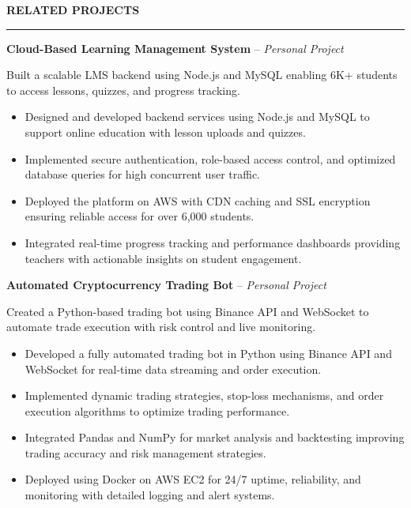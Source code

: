 \documentclass[10pt,letterpaper]{article}
\begin{document}
\vspace{6pt}

\textbf{RELATED PROJECTS}\\[-8pt]
\noindent\rule{\textwidth}{1pt}

\vspace{-2pt}

\textbf{Cloud-Based Learning Management System} -- \emph{Personal Project}

\vspace{-1pt}

Built a scalable LMS backend using Node.js and MySQL enabling 6K+ students to access lessons, quizzes, and progress tracking.
\vspace{-1pt}
\begin{itemize}
\item Designed and developed backend services using Node.js and MySQL to support online education with lesson uploads and quizzes.
\item Implemented secure authentication, role-based access control, and optimized database queries for high concurrent user traffic.
\item Deployed the platform on AWS with CDN caching and SSL encryption ensuring reliable access for over 6,000 students.
\item Integrated real-time progress tracking and performance dashboards providing teachers with actionable insights on student engagement.
\end{itemize}

\textbf{Automated Cryptocurrency Trading Bot} -- \emph{Personal Project}

\vspace{-1pt}

Created a Python-based trading bot using Binance API and WebSocket to automate trade execution with risk control and live monitoring.
\vspace{-1pt}
\begin{itemize}
\item Developed a fully automated trading bot in Python using Binance API and WebSocket for real-time data streaming and order execution.
\item Implemented dynamic trading strategies, stop-loss mechanisms, and order execution algorithms to optimize trading performance.
\item Integrated Pandas and NumPy for market analysis and backtesting improving trading accuracy and risk management strategies.
\item Deployed using Docker on AWS EC2 for 24/7 uptime, reliability, and monitoring with detailed logging and alert systems.
\end{itemize}
\end{document}

